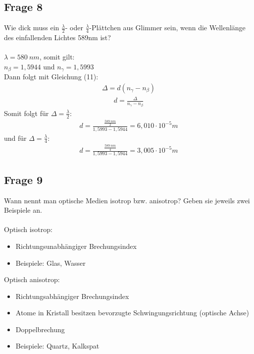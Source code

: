 \documentclass[a4paper,10pt]{scrartcl}
\begin{document}
		\subsection{Frage 8}
			Wie dick muss ein \(\frac{\lambda}{2}\)- oder \(\frac{\lambda}{4}\)-Plättchen aus Glimmer sein, wenn die Wellenlänge des einfallenden
			Lichtes 589nm ist?\\
			\\
			\(\lambda=\SI{580}{nm}\), somit gilt:\\
			\(n_{\beta}=1,5944\) und \(n_{\gamma}=1,5993\)\\
			Dann folgt mit Gleichung (11):
			\begin{align*}
			\Delta=d(n_{\gamma}-n_{\beta})
			\end{align*}
			\begin{align*}
			d=\frac{\Delta}{n_{\gamma}-n_{\beta}}
			\end{align*}
			Somit folgt für \(\Delta=\frac{\lambda}{2}\):
			\begin{align*}
			d=\frac{\frac{\SI{589}{nm}}{2}}{1,5993-1,5944}=6,010\cdot 10^{-5} m
			\end{align*}
			und für \(\Delta=\frac{\lambda}{4}\):
			\begin{align*}
			d=\frac{\frac{\SI{589}{nm}}{4}}{1,5993-1,5944}=3,005\cdot 10^{-5} m
			\end{align*}
			
		\subsection{Frage 9}
			Wann nennt man optische Medien isotrop bzw. anisotrop? Geben sie jeweils zwei Beispiele an.\\
			\\
			Optisch isotrop:
			\begin{itemize}
				\item Richtungsunabhängiger Brechungsindex
				\item Beispiele: Glas, Wasser
			\end{itemize}
		    
		    Optisch anisotrop:
		    \begin{itemize}
		    	\item Richtungsabhängiger Brechungsindex
		    	\item Atome in Kristall besitzen bevorzugte Schwingungsrichtung (optische Achse)
		    	\item Doppelbrechung
		    	\item Beispiele: Quartz, Kalkspat
		    \end{itemize}
	    
\end{document}
